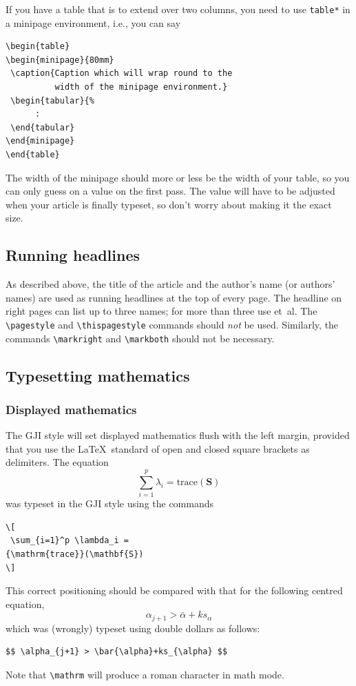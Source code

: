 \documentclass{gji}
\begin{document}
If you have a table that is to extend over two columns, you need to use
\verb"table*" in a minipage environment, i.e., you can say
\begin{verbatim}
\begin{table}
\begin{minipage}{80mm}
 \caption{Caption which will wrap round to the
          width of the minipage environment.}
 \begin{tabular}{%
      :
 \end{tabular}
\end{minipage}
\end{table}
\end{verbatim}
The width of the minipage should more or less be the width of your table,
so you can only guess on a value on the first pass. The value will have to
be adjusted when your article is finally typeset, so don't worry
about making it the exact size.

\subsection{Running headlines}

As described above, the title of the article and the author's name (or
authors' names) are used as running headlines at the top of every page.
The headline on right pages can list up to three names; for more than
three use et~al. The \verb"\pagestyle" and \verb"\thispagestyle"
commands should {\em not\/} be used. Similarly, the commands
\verb"\markright" and \verb"\markboth" should not be necessary.

\subsection{Typesetting mathematics}

\subsubsection{Displayed mathematics}

The GJI style will set displayed mathematics flush with the left margin,
provided that you use the \LaTeX\ standard of open and closed square brackets
as delimiters. The equation
\[
 \sum_{i=1}^p \lambda_i =
{\mathrm{trace}}(\mathbf{S})
\]
was typeset in the GJI style using the commands
\begin{verbatim}
\[
 \sum_{i=1}^p \lambda_i =
{\mathrm{trace}}(\mathbf{S})
\]
\end{verbatim}
This correct positioning should be compared with that for
the following centred equation,
$$ \alpha_{j+1} > \bar{\alpha}+ks_{\alpha} $$
which was (wrongly) typeset using double dollars as follows:
\begin{verbatim}
$$ \alpha_{j+1} > \bar{\alpha}+ks_{\alpha} $$
\end{verbatim}
Note that \verb"\mathrm" will produce a roman character
in math mode.
\end{document}
